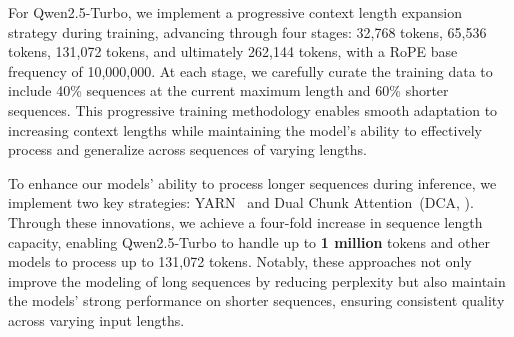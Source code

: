 For Qwen2.5-Turbo, we implement a progressive context length expansion strategy during training, advancing through four stages: 32,768 tokens, 65,536 tokens, 131,072 tokens, and ultimately 262,144 tokens, with a RoPE base frequency of 10,000,000. At each stage, we carefully curate the training data to include 40\% sequences at the current maximum length and 60\% shorter sequences. This progressive training methodology enables smooth adaptation to increasing context lengths while maintaining the model's ability to effectively process and generalize across sequences of varying lengths.


To enhance our models' ability to process longer sequences during inference, we implement two key strategies: YARN~\citep{yarn} and Dual Chunk Attention~(DCA, \citealp{chunkllama}). Through these innovations, we achieve a four-fold increase in sequence length capacity, enabling Qwen2.5-Turbo to handle up to \textbf{1 million} tokens and other models to process up to 131,072 tokens. Notably, these approaches not only improve the modeling of long sequences by reducing perplexity but also maintain the models' strong performance on shorter sequences, ensuring consistent quality across varying input lengths.
